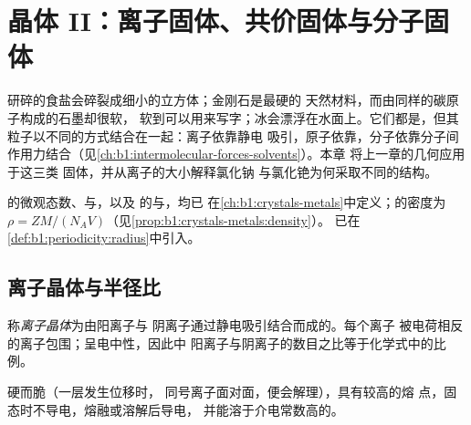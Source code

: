 \chapter{晶体 II：离子固体、共价固体与分子固体}\label{ch:b1:crystals-ionic-covalent}

研碎的食盐会碎裂成细小的立方体；金刚石是最硬的
天然材料，而由同样的碳原子构成的石墨却很软，
软到可以用来写字；冰会漂浮在水面上。它们都是，但其
粒子以不同的方式结合在一起：离子依靠静电
吸引，原子依靠，分子依靠分子间
作用力结合（见\cref{ch:b1:intermolecular-forces-solvents}）。本章
将上一章的几何应用于这三类
固体，并从离子的大小解释氯化钠
与氯化铯为何采取不同的结构。

\begin{recall}
的微观态数、与，以及
的与，均已
在\cref{ch:b1:crystals-metals}中定义；的密度为
$\rho = ZM/(N_A V)$（见\cref{prop:b1:crystals-metals:density}）。
已在\cref{def:b1:periodicity:radius}中引入。
\end{recall}

\section{离子晶体与半径比}

\begin{definition}[离子晶体]\label{def:b1:crystals-ionic-covalent:ionic-crystal}
称\emph{离子晶体}为由阳离子与
阴离子通过静电吸引结合而成的。每个离子
被电荷相反的离子包围；呈电中性，因此中
阳离子与阴离子的数目之比等于化学式中的比例。
\end{definition}

\begin{proposition}[离子晶体的性质]\label{prop:b1:crystals-ionic-covalent:ionic-properties}
硬而脆（一层发生位移时，
同号离子面对面，便会解理），具有较高的熔
点，固态时不导电，熔融或溶解后导电，
并能溶于介电常数高的。
\end{proposition}
\admitted

